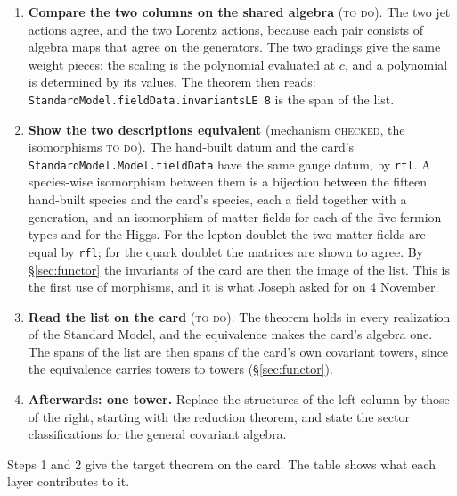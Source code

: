 \documentclass[11pt,a4paper]{article}
\newcommand{\lean}[1]{{\footnotesize\upshape\ttfamily\nolinkurl{#1}}}
\newcommand{\stC}{\textsc{checked}}
\newcommand{\stT}{\textsc{to do}}
\begin{document}
\begin{enumerate}[leftmargin=*, itemsep=2pt]
\item \textbf{Compare the two columns on the shared algebra} (\stT). The two jet actions agree, and the two Lorentz actions, because each pair consists of algebra maps that agree on the generators. The two gradings give the same weight pieces: the scaling is the polynomial evaluated at $c$, and a polynomial is determined by its values. The theorem then reads: \lean{StandardModel.fieldData.invariantsLE 8} is the span of the list.
\item \textbf{Show the two descriptions equivalent} (mechanism \stC, the isomorphisms \stT). The hand-built datum and the card's \lean{StandardModel.Model.fieldData} have the same gauge datum, by \lean{rfl}. A species-wise isomorphism between them is a bijection between the fifteen hand-built species and the card's species, each a field together with a generation, and an isomorphism of matter fields for each of the five fermion types and for the Higgs. For the lepton doublet the two matter fields are equal by \lean{rfl}; for the quark doublet the matrices are shown to agree. By \S\ref{sec:functor} the invariants of the card are then the image of the list. This is the first use of morphisms, and it is what Joseph asked for on 4 November.
\item \textbf{Read the list on the card} (\stT). The theorem holds in every realization of the Standard Model, and the equivalence makes the card's algebra one. The spans of the list are then spans of the card's own covariant towers, since the equivalence carries towers to towers (\S\ref{sec:functor}).
\item \textbf{Afterwards: one tower.} Replace the structures of the left column by those of the right, starting with the reduction theorem, and state the sector classifications for the general covariant algebra.
\end{enumerate}

Steps 1 and 2 give the target theorem on the card. The table shows what each layer contributes to it.
\end{document}
